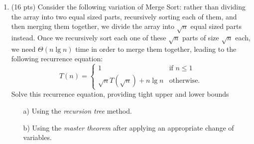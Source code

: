 \documentclass{article}
\begin{document}
\begin{enumerate}
\item (16 pts) Consider the following variation of Merge Sort: rather than dividing the array into
two equal sized parts, recursively sorting each of them, and then merging them together, we divide
the array into $\sqrt{n}$ equal sized parts instead. Once we recursively sort each one of these
$\sqrt{n}$ parts of size $\sqrt{n}$ each, we need $\Theta(n\lg n)$ time in order to merge them together,
leading to the following recurrence equation:
\begin{equation*}
T(n)=
\begin{cases}
1 &\text{if $n\leq 1$}\\
\sqrt{n}T(\sqrt{n})+n\lg n &\text{otherwise.}
\end{cases}
\end{equation*}
Solve this recurrence equation, providing tight upper and lower bounds
\begin{itemize}
\item [a)] Using the \emph{recursion tree} method. 
\item [b)] Using the \emph{master theorem} after applying an appropriate change of variables.
\end{itemize}

\end{enumerate}
\end{document}
